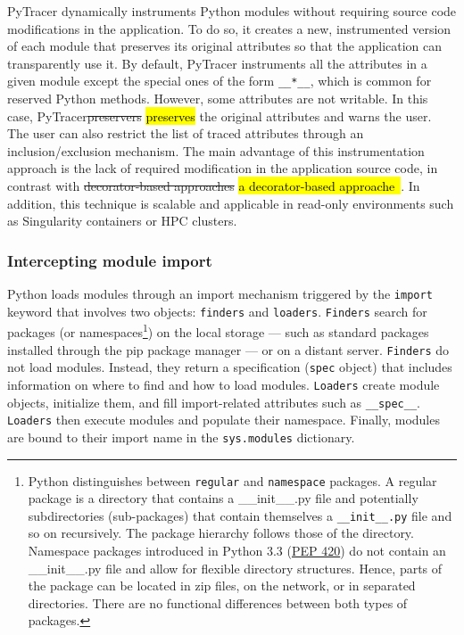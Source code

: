 \documentclass[10pt,journal,compsoc]{IEEEtran}
\newcommand{\pytracer}[0]{PyTracer\xspace}
\DeclareRobustCommand{\add}[1]{\sethlcolor{lightgreen}\hl{#1}}
\DeclareRobustCommand{\remove}[1]{\textcolor{lightred}{\sout{#1}}}
\begin{document}
\pytracer dynamically instruments Python modules without requiring source code
modifications in the application. To do so, it creates a new, instrumented
version of each module that preserves its original attributes so that the
application can transparently use it.
By default, \pytracer instruments all the attributes in a given module except
the special ones of the form \texttt{\_\_*\_\_}, which is common for reserved
Python methods. However, some attributes are not writable. In this case,
\pytracer \remove{preservers} \add{preserves} the original attributes and warns
the user. The user can also restrict the list of traced attributes through an
inclusion/exclusion mechanism. The main advantage of this instrumentation
approach is the lack of required modification in the application source code, in
contrast with \remove{decorator-based approaches} \add{a decorator-based
    approache~\mbox{\cite{hunt2019decorators}}}. In addition, this technique is
scalable and applicable in read-only environments such as Singularity containers
or HPC clusters.





\subsubsection{Intercepting module import}

Python loads modules through an import mechanism triggered by the
\texttt{import} keyword that involves two objects: \texttt{finders} and
\texttt{loaders}. \texttt{Finders} search for packages (or
namespaces\footnote{Python distinguishes between \texttt{regular} and
    \texttt{namespace} packages. A regular package is a directory that contains a
    \_\_init\_\_.py file and potentially subdirectories (sub-packages) that contain
    themselves a \texttt{\_\_init\_\_.py} file and so on recursively. The package
    hierarchy follows those of the directory. Namespace packages introduced in
    Python 3.3 (\href{https://www.python.org/dev/peps/pep-0420/}{PEP 420}) do not
    contain an \_\_init\_\_.py file and allow for flexible directory structures.
    Hence, parts of the package can be located in zip files, on the network, or in
    separated directories. There are no functional differences between both types of
    packages.}) on the local storage --- such as standard packages installed through
the pip package manager --- or on a distant server. \texttt{Finders} do not load
modules. Instead, they return a specification (\texttt{spec} object) that
includes information on where to find and how to load modules. \texttt{Loaders}
create module objects, initialize them, and fill import-related attributes such
as \texttt{\_\_spec\_\_}. \texttt{Loaders} then execute modules and populate
their namespace. Finally, modules are bound to their import name in the
\texttt{sys.modules} dictionary.
\end{document}
